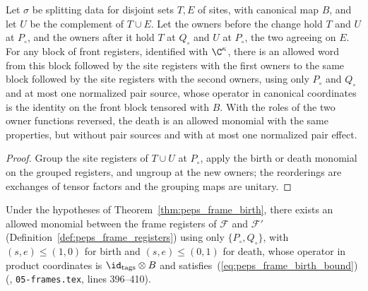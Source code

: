 \begin{lemma}
    \label{lem:lattice_front_births}
    \leanok
    Let $\sigma$ be splitting data for disjoint sets $T,E$ of sites, with canonical
    map $B$, and let $U$ be the complement of $T\cup E$. Let the owners before the
    change hold $T$ and $U$ at $P_\circ$, and the owners after it hold $T$ at
    $Q_\circ$ and $U$ at $P_\circ$, the two agreeing on $E$. For any block of front
    registers, identified with $\C^\kappa$, there is an allowed word from this block
    followed by the site registers with the first owners to the same block followed
    by the site registers with the second owners, using only $P_\circ$ and $Q_\circ$
    and at most one normalized pair source, whose operator in canonical coordinates
    is the identity on the front block tensored with $B$. With the roles of the two
    owner functions reversed, the death is an allowed monomial with the same
    properties, but without pair sources and with at most one normalized pair
    effect.
\end{lemma}

\begin{proof}\leanok
    Group the site registers of $T\cup U$ at $P_\circ$, apply the birth or death
    monomial on the grouped registers, and ungroup at the new owners; the
    reorderings are exchanges of tensor factors and the grouping maps are
    unitary.
\end{proof}

\begin{corollary}
    \label{thm:peps_frame_birth_bounded}
    \leanok
    Under the hypotheses of Theorem~\ref{thm:peps_frame_birth}, there exists an
    allowed monomial between the frame registers of $\mathcal F$ and
    $\mathcal F'$ (Definition~\ref{def:peps_frame_registers}) using only
    $\{P_\circ,Q_\circ\}$, with $(s,e)\le(1,0)$ for birth and $(s,e)\le(0,1)$
    for death, whose operator in product coordinates is $\id_{\rm tags}\otimes B$
    and satisfies~(\ref{eq:peps_frame_birth_bound})
    (\cite[Lemma~6.5]{OpenAI2026PolynomialPEPS}, \texttt{05-frames.tex}, lines 396--410).
\end{corollary}

